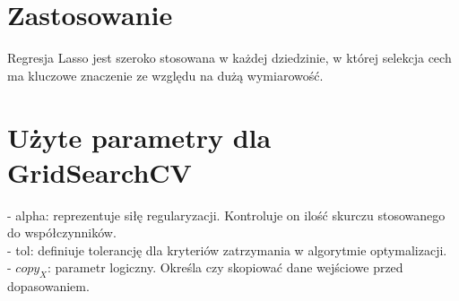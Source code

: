 {}
\section*{Zastosowanie}
\vspace{-1.0em}

\hspace{1.5cm} Regresja Lasso jest szeroko stosowana w każdej dziedzinie, w której selekcja cech ma kluczowe znaczenie ze względu na dużą wymiarowość.

{}
\section*{Użyte parametry dla GridSearchCV \cite{url_Lasso, url_grid_search}}
\vspace{-1.0em}

- alpha: reprezentuje siłę regularyzacji. Kontroluje on ilość skurczu stosowanego do współczynników.\\
- tol: definiuje tolerancję dla kryteriów zatrzymania w algorytmie optymalizacji.\\
- $copy_X$: parametr logiczny. Określa czy skopiować dane wejściowe przed dopasowaniem. \\

